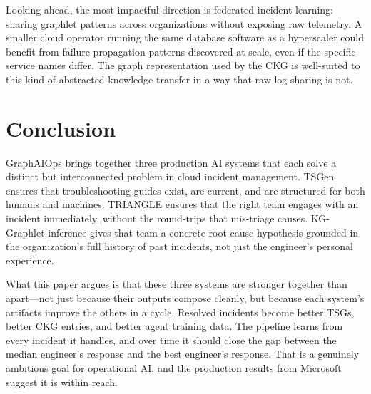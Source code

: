 \documentclass[conference]{IEEEtran}
\begin{document}
Looking ahead, the most impactful direction is federated incident learning: sharing
graphlet patterns across organizations without exposing raw telemetry. A smaller
cloud operator running the same database software as a hyperscaler could benefit
from failure propagation patterns discovered at scale, even if the specific service
names differ. The graph representation used by the CKG is well-suited to this kind
of abstracted knowledge transfer in a way that raw log sharing is not.


\section{Conclusion}

GraphAIOps brings together three production AI systems that each solve a distinct
but interconnected problem in cloud incident management. TSGen ensures that
troubleshooting guides exist, are current, and are structured for both humans and
machines. TRIANGLE ensures that the right team engages with an incident immediately,
without the round-trips that mis-triage causes. KG-Graphlet inference gives that
team a concrete root cause hypothesis grounded in the organization's full history
of past incidents, not just the engineer's personal experience.

What this paper argues is that these three systems are stronger together than
apart---not just because their outputs compose cleanly, but because each system's
artifacts improve the others in a cycle. Resolved incidents become better TSGs,
better CKG entries, and better agent training data. The pipeline learns from every
incident it handles, and over time it should close the gap between the median
engineer's response and the best engineer's response. That is a genuinely ambitious
goal for operational AI, and the production results from Microsoft suggest it is
within reach.
\end{document}
